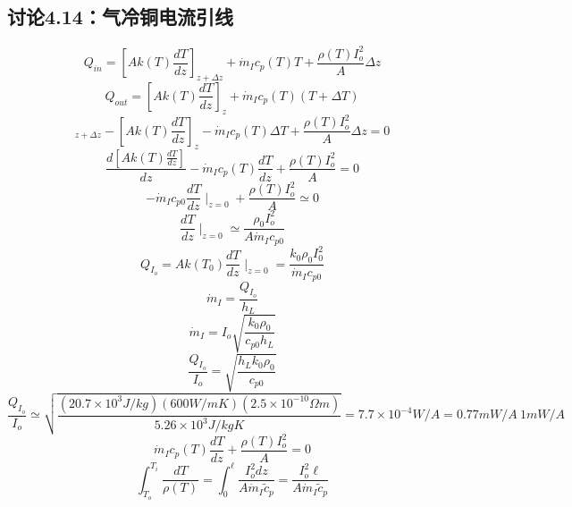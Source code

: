 \subsection{讨论4.14：气冷铜电流引线}
\begin{equation}%
Q_{in}=[Ak(T)\frac{dT}{dz}]_{z+\Delta z}+\dot{m}_Ic_p(T)T+\frac{\rho(T)I_{o}^{2}}{A}\Delta z
\end{equation}
\begin{equation}%
Q_{out}=[Ak(T)\frac{dT}{dz}]_z+\dot{m}_Ic_p(T)(T+\Delta T)
\end{equation}
\begin{equation}%
[Ak(T)\frac{dT}{dz}]_{z+\Delta z}-[Ak(T)\frac{dT}{dz}]_z-\dot{m}_Ic_p(T)\Delta T+\frac{\rho(T)I_{o}^{2}}{A}\Delta z=0
\end{equation}
\begin{equation}%
\frac{d[Ak(T)\frac{dT}{dz}]}{dz}-\dot{m}_Ic_p(T)\frac{dT}{dz}+\frac{\rho(T)I_{o}^{2}}{A}=0
\end{equation}
\begin{equation}%
-\dot{m}_Ic_{p0}\frac{dT}{dz}\mid_{z=0}+\frac{\rho(T)I_{o}^{2}}{A}\simeq0
\end{equation}
\begin{equation}%
\frac{dT}{dz}\mid_{z=0}\simeq\frac{\rho_0I_{o}^{2}}{A\dot{m}_Ic_{p0}}
\end{equation}
\begin{equation}%
Q_{I_o}=Ak(T_0)\frac{dT}{dz}\mid_{z=0}=\frac{k_0\rho_0I_{0}^{2}}{\dot{m}_Ic_{p0}}
\end{equation}
\begin{equation}%
\dot{m}_I=\frac{Q_{I_o}}{h_L}
\end{equation}
\begin{equation}%
\dot{m}_I=I_o\sqrt{\frac{k_0\rho_0}{c_{p0}h_L}}
\end{equation}
\begin{equation}%
\frac{Q_{I_o}}{I_o}=\sqrt{\frac{h_Lk_0\rho_0}{c_{p0}}}
\end{equation}
\begin{equation}%
\frac{Q_{I_o}}{I_o}\simeq\sqrt{\frac{(20.7\times10^3J/kg)(600W/mK)(2.5\times10^{-10}\Omega m)}{5.26\times10^3J/kgK}}
=7.7\times10^{-4}W/A=0.77mW/A~1mW/A
\end{equation}
\begin{equation}%
\dot{m}_Ic_p(T)\frac{dT}{dz}+\frac{\rho(T)I_{o}^{2}}{A}=0
\end{equation}
\begin{equation}%
\int_{T_o}^{T_i}\frac{dT}{\rho(T)}=\int_{0}^{\ell}\frac{I_{o}^{2}dz}{A\dot{m}_I\tilde{c}_p}=\frac{I_{o}^{2}\ell}{A\dot{m}_I\tilde{c}_p}
\end{equation}
